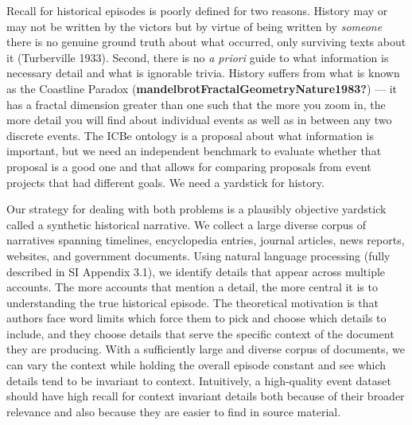 \documentclass{article}
\begin{document}
Recall for historical episodes is poorly defined for two reasons.
History may or may not be written by the victors but by virtue of being
written by \emph{someone} there is no genuine ground truth about what
occurred, only surviving texts about it (Turberville 1933). Second,
there is no \emph{a priori} guide to what information is necessary
detail and what is ignorable trivia. History suffers from what is known
as the Coastline Paradox (\textbf{mandelbrotFractalGeometryNature1983?})
--- it has a fractal dimension greater than one such that the more you
zoom in, the more detail you will find about individual events as well
as in between any two discrete events. The ICBe ontology is a proposal
about what information is important, but we need an independent
benchmark to evaluate whether that proposal is a good one and that
allows for comparing proposals from event projects that had different
goals. We need a yardstick for history.

Our strategy for dealing with both problems is a plausibly objective
yardstick called a synthetic historical narrative. We collect a large
diverse corpus of narratives spanning timelines, encyclopedia entries,
journal articles, news reports, websites, and government documents.
Using natural language processing (fully described in SI Appendix 3.1),
we identify details that appear across multiple accounts. The more
accounts that mention a detail, the more central it is to understanding
the true historical episode. The theoretical motivation is that authors
face word limits which force them to pick and choose which details to
include, and they choose details that serve the specific context of the
document they are producing. With a sufficiently large and diverse
corpus of documents, we can vary the context while holding the overall
episode constant and see which details tend to be invariant to context.
Intuitively, a high-quality event dataset should have high recall for
context invariant details both because of their broader relevance and
also because they are easier to find in source material.
\end{document}

